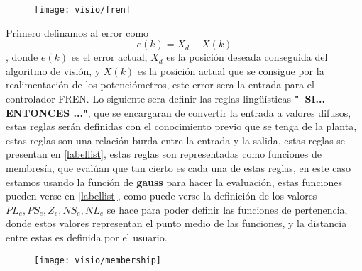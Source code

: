     
\begin{figure}[h]
	\centering
	\texttt{[image: visio/fren]}
	\caption{}
	\label{fig:fren}
\end{figure}
    
    
    Primero definamos al error como \begin{equation}
    	e(k)=X_d - X(k)
    \end{equation}, donde $e(k)$ es el error actual, $X_d$ es la posición deseada conseguida del algoritmo de visión, y $X(k)$ es la posición actual que se consigue por la realimentación de los potenciómetros, este error sera la entrada para el controlador FREN.
    Lo siguiente sera definir las reglas lingüísticas \textbf{"\ SI... ENTONCES ..."}, que se encargaran de convertir la entrada a valores difusos, estas reglas serán definidas con el conocimiento previo que se tenga de la planta, estas reglas son una relación burda entre la entrada y la salida, estas reglas se presentan en \ref{labellist}, estas reglas son representadas como funciones de membresía, que evalúan que tan cierto es cada una de estas reglas, en este caso estamos usando la función de \textbf{gauss} para hacer la evaluación, estas funciones pueden verse en \ref{labellist}, como puede verse la definición de los valores $PL_e,PS_e,Z_e,NS_e,NL_e $ se hace para poder definir las funciones de pertenencia, donde estos valores representan el punto medio de las funciones, y la distancia entre estas es definida por el usuario.
    
    
\begin{figure}[h]
	\centering
	\texttt{[image: visio/membership]}
	\caption{}
	\label{fig:membership}
\end{figure}
    
